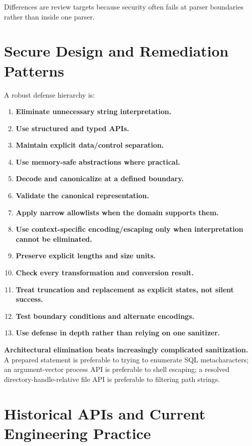 \documentclass[11pt]{article}
\begin{document}
Differences are review targets because security often fails at parser boundaries rather than inside one parser.

\section{Secure Design and Remediation Patterns}

A robust defense hierarchy is:

\begin{enumerate}
  \item \textbf{Eliminate unnecessary string interpretation.}
  \item \textbf{Use structured and typed APIs.}
  \item \textbf{Maintain explicit data/control separation.}
  \item \textbf{Use memory-safe abstractions where practical.}
  \item \textbf{Decode and canonicalize at a defined boundary.}
  \item \textbf{Validate the canonical representation.}
  \item \textbf{Apply narrow allowlists when the domain supports them.}
  \item \textbf{Use context-specific encoding/escaping only when interpretation cannot be eliminated.}
  \item \textbf{Preserve explicit lengths and size units.}
  \item \textbf{Check every transformation and conversion result.}
  \item \textbf{Treat truncation and replacement as explicit states, not silent success.}
  \item \textbf{Test boundary conditions and alternate encodings.}
  \item \textbf{Use defense in depth rather than relying on one sanitizer.}
\end{enumerate}

\begin{defensivepattern}
\textbf{Architectural elimination beats increasingly complicated sanitization.} A prepared statement is preferable to trying to enumerate SQL metacharacters; an argument-vector process API is preferable to shell escaping; a resolved directory-handle-relative file API is preferable to filtering path strings.
\end{defensivepattern}

\section{Historical APIs and Current Engineering Practice}
\end{document}
